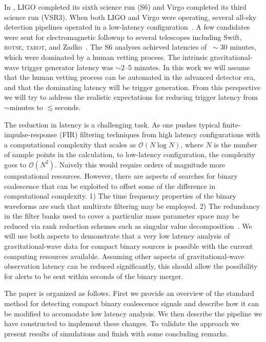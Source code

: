 %
%
In , LIGO completed its sixth science run (S6) and Virgo
completed its third science run (VSR3).   When both LIGO and Virgo were
operating, several all-sky detection pipelines operated in a low-latency
configuration~\cite{HugheyGWPAW2011, S6lowlatency}. A few candidates were sent
for electromagnetic followup to several telescopes including Swift,
\textsc{rotse}, \textsc{tarot}, and Zadko~\cite{kanner2008, HugheyGWPAW2011}.
The S6 analyses achieved latencies of $~\sim$30 minutes, which were dominated by
a human vetting process.  The intrinsic gravitational-wave trigger generator
latency was $\sim$2--5 minutes.  In this work we will assume that the human
vetting process can be automated in the advanced detector era, and that the
dominating latency will be trigger generation.  From this perspective we will
try to address the realistic expectations for reducing trigger latency from
$\sim$minutes to $\lesssim$seconds.

The reduction in latency is a challenging task.  As one pushes typical
finite-impulse-response (FIR) filtering techniques from high latency
configurations with a computational complexity that scales as
$\mathcal{O}(N\log{N})$, where $N$ is the number of sample points in the
calculation, to low-latency configuration, the complexity goes to
$\mathcal{O}(N^2)$.  Naively this would require orders of magnitude more
computational resources.  However, there are aspects of searches for binary
coalescence that can be exploited to offset some of the difference in
computational complexity.  1) The time frequency properties of the binary
waveforms are such that multirate filtering may be employed. 2) The redundancy
in the filter banks used to cover a particular mass parameter space may be
reduced via rank reduction schemes such as singular value
decomposition~\cite{Cannon:2010p10398}.  We will use both aspects to
demonstrate that a very low latency analysis of gravitational-wave data for
compact binary sources is possible with the current computing resources
available.  Assuming other aspects of gravitational-wave observation latency
can be reduced significantly, this should allow the possibility for alerts to
be sent within seconds of the binary merger.

The paper is organized as follows.  First we provide an overview of the 
standard method for detecting compact binary coalescence signals and
describe how it can be modified to accomodate low latency analysis.  We
then describe the pipeline we have constructed to implement these changes.
To validate the approach we present results of simulations and finish
with some concluding remarks.

